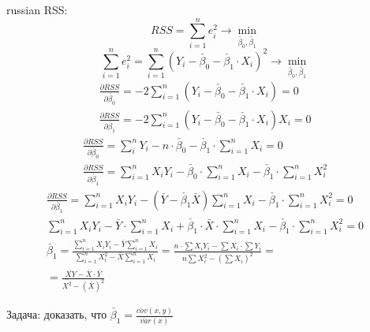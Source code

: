 \documentclass{article}
\begin{document}
\begin{otherlanguage*}{russian}
RSS: 
\begin{equation}
RSS = \sum_{i=1}^n e_i^2 \rightarrow \min_{\check{\beta_0}, \check{\beta_1}}
\end{equation}
\begin{equation}
\sum_{i=1}^n e_i^2 = \sum_{i=1}^n (Y_i - \check{\beta_0} - \check{\beta_1} \cdot X_i)^2 \rightarrow \min_{\check{\beta_0}, \check{\beta_1}}  
\end{equation}
\begin{align}
\frac{\partial RSS}{\partial \check{\beta_0}} =- 2 \sum_{i=1}^n (Y_i - \check{\beta_0} - \check{\beta_1} \cdot X_i) = 0  \\
\frac{\partial RSS}{\partial \check{\beta_1}} = - 2 \sum_{i=1}^n (Y_i - \check{\beta_0} - \check{\beta_1} \cdot X_i) X_i = 0  
\end{align}
\begin{align}
\frac{\partial RSS}{\partial \check{\beta_0}} = \sum_{i}^n Y_i	 - n \cdot \check{\beta_0} - \check{\beta_1} \cdot \sum_{i=1}^n X_i = 0 \\
\frac{\partial RSS}{\partial \check{\beta_1}} = \sum_{i=1}^n X_i Y_i - \check{\beta_0} \cdot \sum_{i=1}^n X_i - \check{\beta_1} \cdot \sum_{i=1}^n X_i^ 2 
\end{align}
\begin{align}
\frac{\partial RSS}{\partial \check{\beta_1}} = \sum_{i=1}^n X_i Y_i - (\bar{Y} - \check{\beta_1} \bar{X}) \sum_{i=1}^n X_i - \check{\beta_1} \cdot \sum_{i=1}^n X_i^2 = 0 \\
\sum_{i=1}^n X_i Y_i - \bar{Y} \cdot \sum_{i=1}^n X_i + \check{\beta_1} \cdot \bar{X} \cdot \sum_{i=1}^n X_i - \check{\beta_1} \cdot \sum_{i=1}^n X_i^2 = 0 \\
\check{\beta_1} = \frac{\sum_{i=1}^n X_i Y_i - \bar{Y} \sum_{i=1}^n X_i}{\sum_{i=1}^n X_i^2 - \bar{X} \sum_{i=1}^n X_i} = \frac{n \cdot \sum X_i Y_i - \sum X_i \cdot \sum Y_i}{n \sum X_i^2 - (\sum X_i)^2} = \\
= \frac{\bar{XY} - \bar{X} \cdot \bar{Y}}{\bar{X^2} - (\bar{X})^2}
\end{align}

Задача: доказать, что $ \check{\beta_1} = \frac{\check{cov} (x, y)}{\check{var} (x)}$


\end{otherlanguage*}
\end{document}
